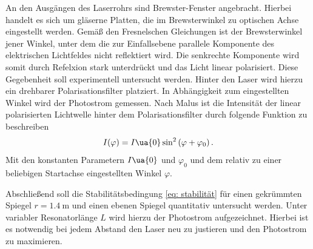 An den Ausgängen des Laserrohrs sind Brewster-Fenster angebracht. Hierbei handelt es sich um gläserne Platten, die
im Brewsterwinkel zu optischen Achse eingestellt werden. Gemäß den Fresnelschen Gleichungen ist der Brewsterwinkel jener Winkel, unter dem
die zur Einfallsebene parallele Komponente des elektrischen Lichtfeldes nicht reflektiert wird. Die senkrechte Komponente wird somit
durch Refelxion stark unterdrückt und das Licht linear polarisiert. Diese Gegebenheit soll
experimentell untersucht werden. Hinter den Laser wird hierzu ein drehbarer Polarisationsfilter platziert. In Abhängigkeit zum eingestellten Winkel
wird der Photostrom gemessen. Nach Malus ist die Intensität der linear polarisierten Lichtwelle hinter dem Polarisationsfilter
durch folgende Funktion zu beschreiben
\begin{equation}
  I(\varphi) = I\ua{0} \sin^2\left(\varphi + \varphi_0\right).
  \label{eq: malus}
\end{equation}
Mit den konstanten Parametern $I\ua{0}$ und $\varphi_0$ und dem relativ zu einer beliebigen Startachse eingestellten Winkel $\varphi$.

Abschließend soll die Stabilitätsbedingung \eqref{eq: stabilität} für
einen gekrümmten Spiegel $r = \SI{1.4}{\meter}$ und einen ebenen Spiegel quantitativ untersucht werden. Unter variabler Resonatorlänge $L$ wird hierzu der
Photostrom aufgezeichnet. Hierbei ist es notwendig bei jedem Abstand den Laser neu zu justieren und den Photostrom zu maximieren.
